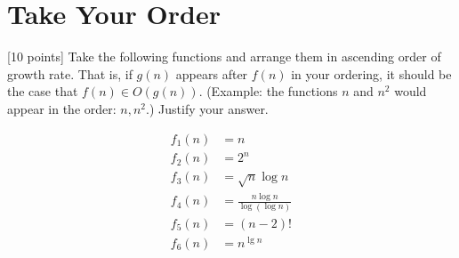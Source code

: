 \section{Take Your Order}

[10 points] Take the following functions and arrange them in ascending order of growth rate. That is, if $g(n)$ appears after $f(n)$ in your ordering, it should be the case that $f(n) \in O(g(n))$. (Example: the functions $n$ and $n^2$ would appear in the order: $n, n^2$.) Justify your answer.

\begin{align*}
    f_1(n) &= n \\
    f_2(n) &= 2^n \\
    f_3(n) &= \sqrt{n} \log n \\
    f_4(n) &= \frac{n \log n}{\log(\log n )} \\
    f_5(n) &= (n-2)! \\
    f_6(n) &= n^{\lg n}
\end{align*}

\ifsolutions\fi